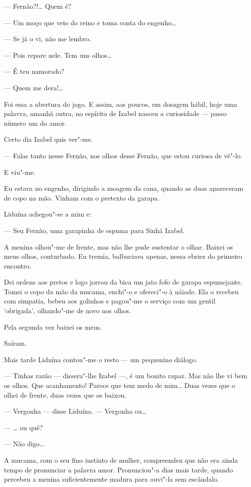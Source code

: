 --- Fernão?!\ldots{} Quem é?

--- Um moço que veio do reino e toma conta do engenho\ldots{}

--- Se já o vi, não me lembro.

--- Pois repare nele. Tem uns olhos\ldots{}

--- É teu namorado?

--- Quem me dera!\ldots{}

Foi essa a abertura do jogo. E assim, aos poucos, em dosagem hábil, hoje
uma palavra, amanhã outra, no espírito de Izabel nasceu a curiosidade
--- passo número um do amor.

Certo dia Izabel quis ver"-me.

--- Falas tanto nesse Fernão, nos olhos desse Fernão, que estou curiosa
de vê"-lo.

E viu"-me.

Eu estava no engenho, dirigindo a moagem da cana, quando as duas
apareceram de copo na mão. Vinham com o pretexto da garapa.

Liduína achegou"-se a mim e:

--- Seu Fernão, uma garapinha de espuma para Sinhá Izabel.

A menina olhou"-me de frente, mas não lhe pude sustentar o olhar. Baixei
os meus olhos, conturbado. Eu tremia, balbuciava apenas, nessa ebriez do
primeiro encontro.

Dei ordens aos pretos e logo jorrou da bica um jato fofo de garapa
espumejante. Tomei o copo da mão da mucama, enchi"-o e ofereci"-o à
náiade. Ela o recebeu com simpatia, bebeu aos golinhos e pagou"-me o
serviço com um gentil `obrigada', olhando"-me de novo nos olhos.

Pela segunda vez baixei os meus.

Saíram.

Mais tarde Liduína contou"-me o resto --- um pequenino diálogo.

--- Tinhas razão --- dissera"-lhe Izabel ---, é um bonito rapaz. Mas não
lhe vi bem os olhos. Que acanhamento! Parece que tem medo de mim\ldots{} Duas
vezes que o olhei de frente, duas vezes que os baixou.

--- Vergonha --- disse Liduína. --- Vergonha ou\ldots{}

--- \ldots{} ou quê?

--- Não digo\ldots{}

A mucama, com o seu fino instinto de mulher, compreendeu que não era
ainda tempo de pronunciar a palavra amor. Pronunciou"-a dias mais tarde,
quando percebeu a menina suficientemente madura para ouvi"-la sem
escândalo.

